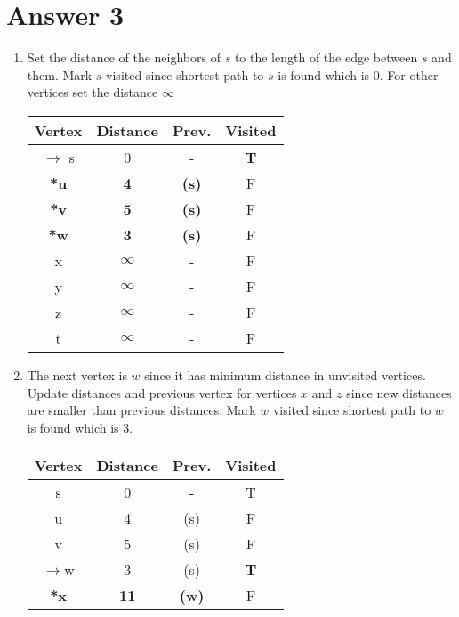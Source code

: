 \documentclass[12pt]{article}
\begin{document}
\section*{Answer 3}
\begin{enumerate} [1)]
    \item Set the distance of the neighbors of $s$ to the length of the edge between $s$ and them. Mark $s$ visited since shortest path to $s$ is found which is 0. For other vertices set the distance $\infty$
    \begin{center}
        \begin{tabular}{|c|c|c|c|}
        \hline
        \textbf{Vertex} & \textbf{Distance} & \textbf{Prev.} & \textbf{Visited}\\ \hline
        $\rightarrow$ s & 0 & - & \textbf{T}\\ \hline
        \textbf{*u} & \textbf{4} & \textbf{(s)} & F\\ \hline
        \textbf{*v} & \textbf{5} & \textbf{(s)} & F\\ \hline
        \textbf{*w} & \textbf{3} & \textbf{(s)} & F\\ \hline
        x & $\infty$ & - & F \\ \hline
        y & $\infty$ & - & F\\ \hline
        z & $\infty$ & - & F\\ \hline
        t & $\infty$ & - & F\\ \hline
        \end{tabular}
    \end{center}
    \item The next vertex is $w$ since it has minimum distance in unvisited vertices. Update distances and previous vertex for vertices $x$ and $z$ since new distances are smaller than previous distances. Mark $w$ visited since shortest path to $w$ is found which is 3.
    \begin{center}
        \begin{tabular}{|c|c|c|c|}
        \hline
        \textbf{Vertex} & \textbf{Distance} & \textbf{Prev.} & \textbf{Visited}\\ \hline 
        s & 0 & - & T\\ \hline
        u & 4 & (s) & F\\ \hline
        v & 5 & (s) & F\\ \hline
        $\rightarrow$w & 3 & (s) & \textbf{T}\\ \hline
        \textbf{*x} & \textbf{11} & \textbf{(w)} & F \\ \hline

\end{tabular}
\end{center}
\end{enumerate}
\end{document}
